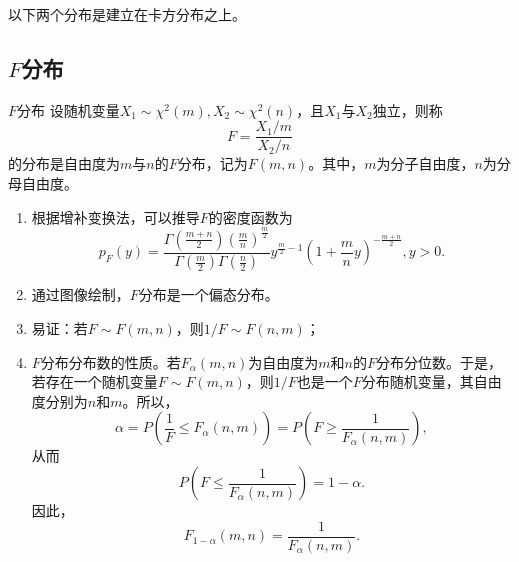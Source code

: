 以下两个分布是建立在卡方分布之上。
\subsection{$F$分布}
\begin{definition}{$F$分布}
    设随机变量$X_{1}\sim \chi^{2}(m),X_{2}\sim \chi^{2}(n)$，且$X_{1}$与$X_{2}$独立，则称
    $$F=\frac{X_{1} /m }{X_{2}/n}$$
    的分布是自由度为$m$与$n$的$F$分布，记为$F(m,n)$。其中，$m$为分子自由度，$n$为分母自由度。
\end{definition}

\begin{remark}
    \begin{enumerate}
        \item 根据增补变换法，可以推导$F$的密度函数为
        $$
        p_F(y) = \frac{\Gamma\left(\frac{m+n}{2}\right) \left(\frac{m}{n}\right)^{\frac{m}{2}} }{\Gamma\left(\frac{m}{2}\right) \Gamma\left(\frac{n}{2}\right)}  y^{\frac{m}{2}-1} \left(1+\frac{m}{n}y\right)^{-\frac{m+n}{2}}, y>0.
        $$
        \item 通过图像绘制，$F$分布是一个偏态分布。
        \item 易证：若$F \sim F(m,n)$，则$1/F \sim F(n,m)$；
        \item $F$分布分布数的性质。若$F_{\alpha}(m,n)$为自由度为$m$和$n$的$F$分布分位数。于是，若存在一个随机变量$F \sim F(m,n)$，则$1/F$也是一个$F$分布随机变量，其自由度分别为$n$和$m$。所以，
        $$
        \alpha  = P\left(\frac{1}{F}\leq F_{\alpha}(n,m)\right) 
        = P\left(F \geq \frac{1}{F_{\alpha}(n,m)}\right),
        $$
        从而
        $$
        P\left( F \leq \frac{1}{F_{\alpha}(n,m)}\right) =1-\alpha.
        $$
        因此，
        $$
        F_{1-\alpha} (m,n) = \frac{1}{F_{\alpha}(n,m)}.
        $$
    \end{enumerate}
\end{remark}
